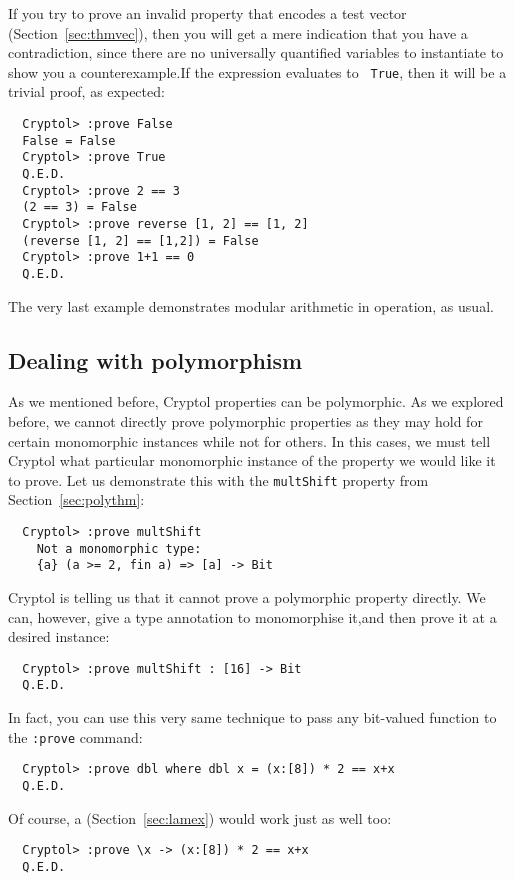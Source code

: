 If you try to prove an invalid property that encodes a test vector
(Section~\ref{sec:thmvec}), then you will get a mere indication that
you have a contradiction, since there are no universally quantified
variables to instantiate to show you a
counterexample.\indContradiction  If the expression evaluates to {\tt
  True}, then it will be a trivial proof, as expected:
\begin{Verbatim}
  Cryptol> :prove False
  False = False
  Cryptol> :prove True
  Q.E.D.
  Cryptol> :prove 2 == 3
  (2 == 3) = False
  Cryptol> :prove reverse [1, 2] == [1, 2]
  (reverse [1, 2] == [1,2]) = False
  Cryptol> :prove 1+1 == 0
  Q.E.D.
\end{Verbatim}
The very last example demonstrates modular arithmetic in operation, as
usual.\indModular

\subsection{Dealing with polymorphism}
\label{sec:deal-with-polym}

As we mentioned before, Cryptol properties can be polymorphic. As we
explored before, we cannot directly prove polymorphic properties as
they may hold for certain monomorphic instances while not for others.
In this cases, we must tell Cryptol what particular monomorphic
instance of the property we would like it to prove.  Let us
demonstrate this with the \texttt{multShift} property from
Section~\ref{sec:polythm}:
\begin{Verbatim}
  Cryptol> :prove multShift
    Not a monomorphic type:
    {a} (a >= 2, fin a) => [a] -> Bit
\end{Verbatim}
Cryptol is telling us that it cannot prove a polymorphic property
directly. We can, however, give a type annotation to monomorphise
it,\indTypeAnnotation and then prove it at a desired instance:
\begin{Verbatim}
  Cryptol> :prove multShift : [16] -> Bit
  Q.E.D.
\end{Verbatim}
In fact, you can use this very same technique to pass any bit-valued
function to the {\tt :prove} command:\indCmdProve\indWhere
\begin{Verbatim}
  Cryptol> :prove dbl where dbl x = (x:[8]) * 2 == x+x
  Q.E.D.
\end{Verbatim}
Of course, a \lamex (Section~\ref{sec:lamex}) would work just as well
too:\indLamExp
\begin{Verbatim}
  Cryptol> :prove \x -> (x:[8]) * 2 == x+x
  Q.E.D.
\end{Verbatim}


